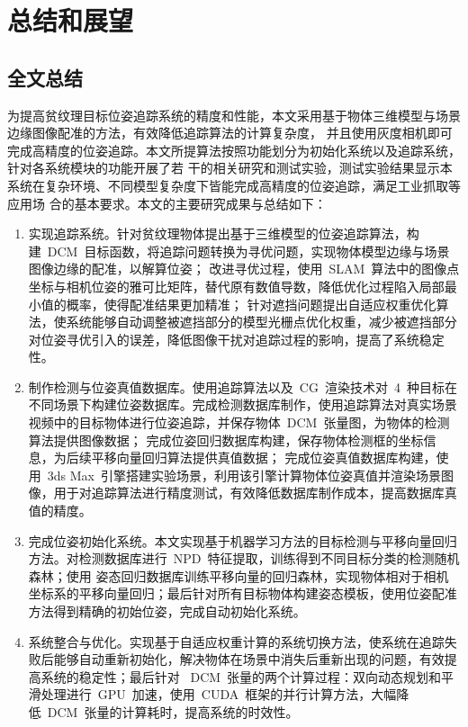 \chapter{总结和展望}
\label{cha:chap6}
\section{全文总结}
\label{sec:6.1}
\label{sec:all:summary}
为提高贫纹理目标位姿追踪系统的精度和性能，本文采用基于物体三维模型与场景边缘图像配准的方法，有效降低追踪算法的计算复杂度，
并且使用灰度相机即可完成高精度的位姿追踪。本文所提算法按照功能划分为初始化系统以及追踪系统，针对各系统模块的功能开展了若
干的相关研究和测试实验，测试实验结果显示本系统在复杂环境、不同模型复杂度下皆能完成高精度的位姿追踪，满足工业抓取等应用场
合的基本要求。本文的主要研究成果与总结如下：
\begin{enumerate}
    \item 实现追踪系统。针对贫纹理物体提出基于三维模型的位姿追踪算法，构建~DCM~目标函数，将追踪问题转换为寻优问题，实现物体模型边缘与场景图像边缘的配准，以解算位姿；
    改进寻优过程，使用~SLAM~算法中的图像点坐标与相机位姿的雅可比矩阵，替代原有数值导数，降低优化过程陷入局部最小值的概率，使得配准结果更加精准；
    针对遮挡问题提出自适应权重优化算法，使系统能够自动调整被遮挡部分的模型光栅点优化权重，减少被遮挡部分对位姿寻优引入的误差，降低图像干扰对追踪过程的影响，提高了系统稳定性。
    \item 制作检测与位姿真值数据库。使用追踪算法以及~CG~渲染技术对~4~种目标在不同场景下构建位姿数据库。完成检测数据库制作，使用追踪算法对真实场景视频中的目标物体进行位姿追踪，并保存物体~DCM~张量图，为物体的检测算法提供图像数据；
    完成位姿回归数据库构建，保存物体检测框的坐标信息，为后续平移向量回归算法提供真值数据；
    完成位姿真值数据库构建，使用~3ds Max~引擎搭建实验场景，利用该引擎计算物体位姿真值并渲染场景图像，用于对追踪算法进行精度测试，有效降低数据库制作成本，提高数据库真值的精度。
    \item 完成位姿初始化系统。本文实现基于机器学习方法的目标检测与平移向量回归方法。对检测数据库进行~NPD~特征提取，训练得到不同目标分类的检测随机森林；使用
    姿态回归数据库训练平移向量的回归森林，实现物体相对于相机坐标系的平移向量回归；最后针对所有目标物体构建姿态模板，使用位姿配准方法得到精确的初始位姿，完成自动初始化系统。
    \item 系统整合与优化。实现基于自适应权重计算的系统切换方法，使系统在追踪失败后能够自动重新初始化，解决物体在场景中消失后重新出现的问题，有效提高系统的稳定性；最后针对
    ~DCM~张量的两个计算过程：双向动态规划和平滑处理进行~GPU~加速，使用~CUDA~框架的并行计算方法，大幅降低~DCM~张量的计算耗时，提高系统的时效性。

\end{enumerate}
